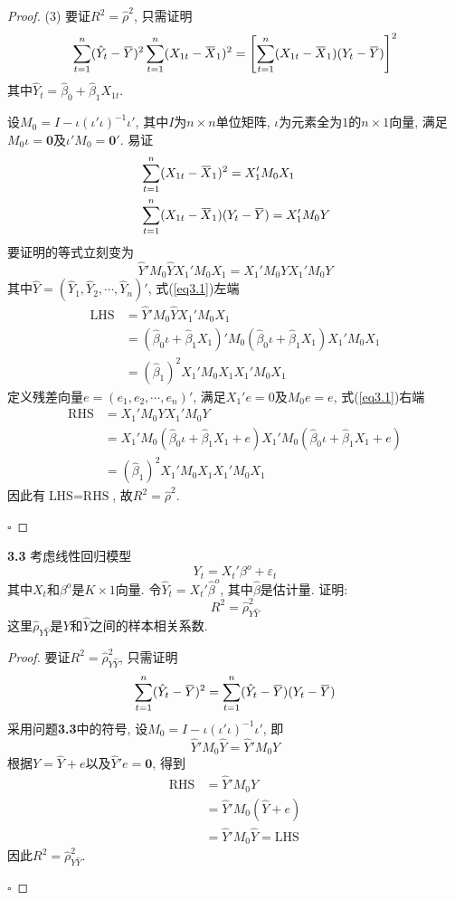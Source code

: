 \documentclass[cn,12pt,math=mtpro2,citestyle=gb7714-2015,bibstyle=gb7714-2015,twocol,mode=simple]{elegantbook}
\newcommand{\overbar}[1]{\mkern 1.5mu\overline{\mkern-1.5mu#1\mkern-1.5mu}\mkern 1.5mu}
\newcommand{\hbeta}{\hat{\beta}}
\begin{document}
\begin{proof}
(3) 要证$R^2=\hat{\rho}^2$, 只需证明$$\displaystyle \sum_{t=1}^{n}(\hat{Y}_t-\overbar{Y})^2\sum_{t=1}^{n}(X_{1t}-\overbar{X}_1)^2=\left[\sum_{t=1}^{n}(X_{1t}-\overbar{X}_1)(Y_t-\overbar{Y})\right]^2$$
其中$\hat{Y}_t=\hbeta_0+\hbeta_1X_{1t}$.

设$M_0=I-\iota(\iota'\iota)^{-1}\iota'$, 其中$I$为$n \times n$单位矩阵, $\iota$为元素全为$1$的$n\times 1$向量, 满足$M_0\iota=\mathbf{0}$及$\iota'M_0=\mathbf{0}'$. 易证
\begin{align}
&\sum_{t=1}^{n}(X_{1t}-\overbar{X}_1)^2=X_1'M_0X_1 \nonumber \\
&\sum_{t=1}^{n}(X_{1t}-\overbar{X}_1)(Y_t-\overbar{Y})=X_1'M_0Y \nonumber
\end{align}
要证明的等式立刻变为
\begin{equation}\label{eq3.1}
\hat{Y}'M_0\hat{Y}X_1'M_0X_1=X_1'M_0YX_1'M_0Y \tag{3.1}
\end{equation}
其中$\hat{Y}=(\hat{Y}_1,\hat{Y}_2,\cdots,\hat{Y}_n)'$, 式(\ref{eq3.1})左端
\begin{align}
\text{LHS}&=\hat{Y}'M_0\hat{Y}X_1'M_0X_1 \nonumber \\
&=(\hbeta_0\iota+\hbeta_1X_1)'M_0(\hbeta_0\iota+\hbeta_1X_1)X_1'M_0X_1 \nonumber \\
&=(\hbeta_1)^2X_1'M_0X_1X_1'M_0X_1  \nonumber
\end{align}
定义残差向量$e=(e_1,e_2,\cdots,e_n)'$, 满足$X_1'e=0$及$M_0e=e$, 式(\ref{eq3.1})右端
\begin{align}
\text{RHS}&=X_1'M_0YX_1'M_0Y \nonumber \\
&=X_1'M_0(\hbeta_0\iota+\hbeta_1X_1+e)X_1'M_0(\hbeta_0\iota+\hbeta_1X_1+e) \nonumber  \\
&=(\hbeta_1)^2X_1'M_0X_1X_1'M_0X_1 \nonumber
\end{align}
因此有$\text{LHS}=\text{RHS}$, 故$R^2=\hat{\rho}^2$.

$\square$
\end{proof}

\textbf{3.3} 考虑线性回归模型
$$Y_t=X_t'\beta^o+\varepsilon_t$$
其中$X_t$和$\beta^o$是$K\times 1$向量. 令$\hat{Y}_t=X_t'\hbeta^o$, 其中$\hbeta$是估计量. 证明:
$$R^2=\hat{\rho}^2_{Y\hat{Y}}$$
这里$\hat{\rho}_{Y\hat{Y}}$是$Y$和$\hat{Y}$之间的样本相关系数.

\begin{proof}
  要证$R^2=\hat{\rho}^2_{Y\hat{Y}}$, 只需证明
  $$\sum_{t=1}^{n}(\hat{Y}_t-\overbar{Y})^2=\sum_{t=1}^{n}(\hat{Y}_t-\overbar{Y})(Y_t-\overbar{Y})$$
  采用问题\textbf{3.3}中的符号, 设$M_0=I-\iota(\iota'\iota)^{-1}\iota'$, 即
  $$\hat{Y}'M_0\hat{Y}=\hat{Y}'M_0Y$$
  根据$Y=\hat{Y}+e$以及$\hat{Y}'e=\mathbf{0}$, 得到
  \begin{align}
  \text{RHS}&=\hat{Y}'M_0Y \nonumber \\
  &=\hat{Y}'M_0(\hat{Y}+e) \nonumber \\
  &=\hat{Y}'M_0\hat{Y}=\text{LHS} \nonumber
  \end{align}
  因此$R^2=\hat{\rho}^2_{Y\hat{Y}}$.

  $\square$
\end{proof}
\end{document}
